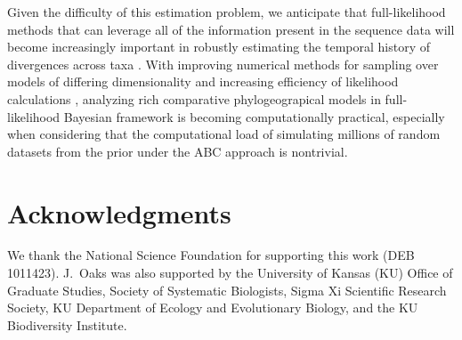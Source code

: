 \documentclass[letterpaper,12pt]{article}
\begin{document}
\begin{linenumbers}
Given the difficulty of this estimation problem, we anticipate that
full-likelihood methods that can leverage all of the information present in the
sequence data will become increasingly important in robustly estimating the
temporal history of divergences across taxa \citep{JeetDiss}.
With improving numerical methods for sampling over models of differing
dimensionality \citep{Green1995,Lemey2009} and increasing efficiency of
likelihood calculations \citep{Ayres2012}, analyzing rich comparative
phylogeograpical models in full-likelihood Bayesian framework is becoming
computationally practical, especially when considering that the computational
load of simulating millions of random datasets from the prior under the ABC
approach is nontrivial.


\section*{Acknowledgments}
We thank the National Science Foundation for supporting this work (DEB
1011423).
J.\ Oaks was also supported by the University of Kansas (KU) Office of Graduate
Studies, Society of Systematic Biologists, Sigma Xi Scientific Research
Society, KU Department of Ecology and Evolutionary Biology, and the KU
Biodiversity Institute.



\newpage
\singlespacing

\renewcommand\listfigurename{Figure Captions}
\renewcommand\cftdotsep{\cftnodots}
\setlength\cftbeforefigskip{10pt}
\listoffigures


\end{linenumbers}

\newpage
\singlespacing
\end{document}
